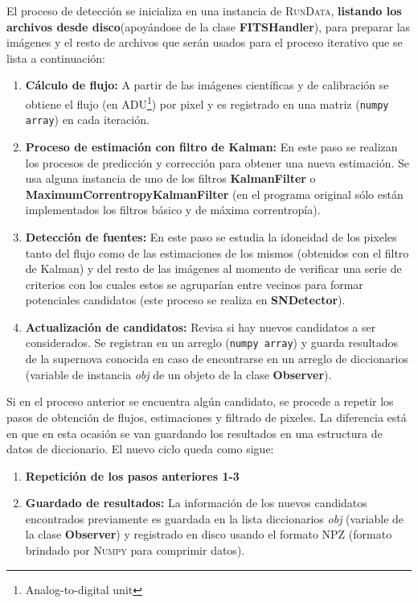 El proceso de detecci\'on se inicializa en una instancia de \textsc{RunData}, \textbf{listando los archivos desde disco}(apoy\'andose de la clase \textbf{FITSHandler}), para preparar las im\'agenes y el resto de archivos que ser\'an usados para el proceso iterativo que se lista a continuaci\'on: 

\begin{enumerate}
\item \textbf{C\'alculo de flujo:} A partir de las im\'agenes cient\'ificas y de calibraci\'on se obtiene el flujo (en ADU\footnote{Analog-to-digital unit}) por pixel y es registrado en una matriz (\texttt{numpy array}) en cada iteraci\'on. 
\item \textbf{Proceso de estimaci\'on con filtro de Kalman:} En este paso se realizan los procesos de predicci\'on y correcci\'on para obtener una nueva estimaci\'on. Se usa alguna instancia de uno de los filtros \textbf{KalmanFilter} o \textbf{MaximumCorrentropyKalmanFilter} (en el programa original s\'olo est\'an implementados los filtros b\'asico y de m\'axima correntrop\'ia). 
\item \textbf{Detecci\'on de fuentes:} En este paso se estudia la idoneidad de los pixeles tanto del flujo como de las estimaciones de los mismos (obtenidos con el filtro de Kalman) y del resto de las im\'agenes al momento de verificar una serie de criterios con los cuales estos se agrupar\'ian entre vecinos para formar potenciales candidatos (este proceso se realiza en \textbf{SNDetector}).  
\item \textbf{Actualizaci\'on de candidatos:} Revisa si hay nuevos candidatos a ser considerados. Se registran en un arreglo (\texttt{numpy array}) y guarda resultados de la supernova conocida en caso de encontrarse en un arreglo de diccionarios (variable de instancia \textit{obj} de un objeto de la clase \textbf{Observer}).
\end{enumerate}

Si en el proceso anterior se encuentra alg\'un candidato, se procede a repetir los pasos de obtenci\'on de flujos, estimaciones y filtrado de pixeles. La diferencia est\'a en que en esta ocasi\'on se van guardando los resultados en una estructura de datos de diccionario. El nuevo ciclo queda como sigue:

\begin{enumerate}

\item \textbf{Repetici\'on de los pasos anteriores 1-3}
\item \textbf{Guardado de resultados:} La informaci\'on de los nuevos candidatos encontrados previamente es guardada en la lista diccionarios \textit{obj} (variable de la clase \textbf{Observer}) y registrado en disco usando el formato NPZ (formato brindado por \textsc{Numpy} para comprimir datos).
\end{enumerate}


